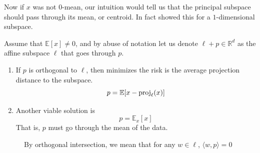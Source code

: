   Now if $x$ was not $0$-mean, our intuition would tell us that the principal subspace should pass through its mean, or centroid. In fact \cite{1901pearson} showed this for a $1$-dimensional subspace. 

  \begin{lemma}
    Assume that $\mathbb{E}[x] \neq 0$, and by abuse of notation let us denote $\ell + p \in \mathbb{R}^d$ as the affine subspace $\ell$ that goes through $p$. 
    \begin{enumerate}
      \item If $p$ is orthogonal to $\ell$, then minimizes the risk is the average projection distance to the subspace. 
      \begin{equation}
        p = \mathbb{E}[x - \operatorname{proj}_\ell (x)]
      \end{equation}

      \item Another viable solution is 
        \begin{equation}
          p = \mathbb{E}_x [x]
        \end{equation}
        That is, $p$ must go through the mean of the data. 
    \end{enumerate}

    \begin{figure}[H]
      \centering 
      \caption{By orthogonal intersection, we mean that for any $w \in \ell$, $\langle w, p \rangle = 0$} 
    \end{figure}
  \end{lemma}

